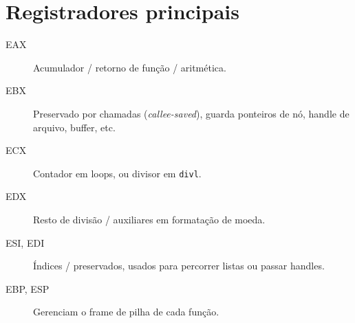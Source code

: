 \documentclass[12pt]{article}
\begin{document}
\section{Registradores principais}
    \begin{description}
      \item[EAX] Acumulador / retorno de função / aritmética.
      \item[EBX] Preservado por chamadas (\emph{callee-saved}), guarda ponteiros de nó, handle de arquivo, buffer, etc.
      \item[ECX] Contador em loops, ou divisor em \texttt{divl}.
      \item[EDX] Resto de divisão / auxiliares em formatação de moeda.
      \item[ESI, EDI] Índices / preservados, usados para percorrer listas ou passar handles.
      \item[EBP, ESP] Gerenciam o frame de pilha de cada função.
    \end{description}
\end{document}
